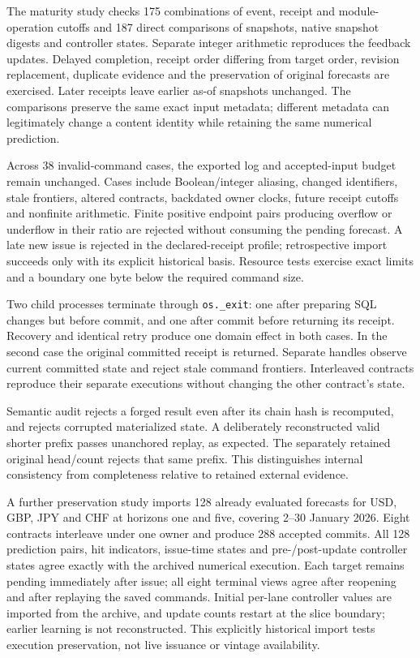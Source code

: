 \documentclass[11pt,a4paper]{article}
\theoremstyle{definition}\newtheorem{definition}[theorem]{Definition}
\begin{document}
The maturity study checks 175 combinations of event, receipt and module-operation cutoffs and 187 direct comparisons of snapshots, native snapshot digests and controller states. Separate integer arithmetic reproduces the feedback updates. Delayed completion, receipt order differing from target order, revision replacement, duplicate evidence and the preservation of original forecasts are exercised. Later receipts leave earlier as-of snapshots unchanged. The comparisons preserve the same exact input metadata; different metadata can legitimately change a content identity while retaining the same numerical prediction.

Across 38 invalid-command cases, the exported log and accepted-input budget remain unchanged. Cases include Boolean/integer aliasing, changed identifiers, stale frontiers, altered contracts, backdated owner clocks, future receipt cutoffs and nonfinite arithmetic. Finite positive endpoint pairs producing overflow or underflow in their ratio are rejected without consuming the pending forecast. A late new issue is rejected in the declared-receipt profile; retrospective import succeeds only with its explicit historical basis. Resource tests exercise exact limits and a boundary one byte below the required command size.

Two child processes terminate through \texttt{os.\_exit}: one after preparing SQL changes but before commit, and one after commit before returning its receipt. Recovery and identical retry produce one domain effect in both cases. In the second case the original committed receipt is returned. Separate handles observe current committed state and reject stale command frontiers. Interleaved contracts reproduce their separate executions without changing the other contract's state.

Semantic audit rejects a forged result even after its chain hash is recomputed, and rejects corrupted materialized state. A deliberately reconstructed valid shorter prefix passes unanchored replay, as expected. The separately retained original head/count rejects that same prefix. This distinguishes internal consistency from completeness relative to retained external evidence.

A further preservation study imports 128 already evaluated forecasts for USD, GBP, JPY and CHF at horizons one and five, covering 2--30 January 2026. Eight contracts interleave under one owner and produce 288 accepted commits. All 128 prediction pairs, hit indicators, issue-time states and pre-/post-update controller states agree exactly with the archived numerical execution. Each target remains pending immediately after issue; all eight terminal views agree after reopening and after replaying the saved commands. Initial per-lane controller values are imported from the archive, and update counts restart at the slice boundary; earlier learning is not reconstructed. This explicitly historical import tests execution preservation, not live issuance or vintage availability.
\end{document}
